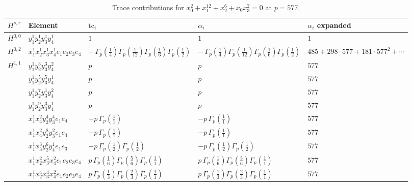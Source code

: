 \documentclass[11pt]{article}
\begin{document}
\begin{table}[ht]
\centering
\caption{Trace contributions for $x_0^{2} + x_1^{12} + x_2^{6} + x_0 x_3^{2} = 0$ at $p=577$.}\label{tab:deformed-25}
\renewcommand{\arraystretch}{1.1}
{\scriptsize
\begin{tabular}{@{}lllll@{}}
\toprule
$H^{s,r}$ & Element & $\mathrm{tc}_i$ & $\alpha_i$ & $\alpha_i$ expanded \\
\midrule
$H^{0,0}$ & $y_{1}^{1} y_{2}^{1} y_{3}^{1} y_{4}^{1}$ & $1$ & $1$ & $1$ \\
\midrule
$H^{0,2}$ & $x_{1}^{1} x_{2}^{1} x_{3}^{1} x_{4}^{1}  e_{1} e_{2} e_{3} e_{4}$ & $- \, \Gamma_p \left( \frac{1}{4} \right) \Gamma_p \left( \frac{1}{12} \right) \Gamma_p \left( \frac{1}{6} \right) \Gamma_p \left( \frac{1}{2} \right)$ & $- \, \Gamma_p \left( \frac{1}{4} \right) \Gamma_p \left( \frac{1}{12} \right) \Gamma_p \left( \frac{1}{6} \right) \Gamma_p \left( \frac{1}{2} \right)$ & $485{+}298{\cdot}577{+}181{\cdot}577^{2}{+}\cdots$ \\
\midrule
$H^{1,1}$ & $y_{1}^{1} y_{2}^{3} y_{3}^{3} y_{4}^{2}$ & $p \,$ & $p \,$ & $577$ \\
 & $y_{1}^{1} y_{2}^{5} y_{3}^{5} y_{4}^{1}$ & $p \,$ & $p \,$ & $577$ \\
 & $y_{1}^{1} y_{2}^{7} y_{3}^{1} y_{4}^{2}$ & $p \,$ & $p \,$ & $577$ \\
 & $y_{1}^{1} y_{2}^{9} y_{3}^{3} y_{4}^{1}$ & $p \,$ & $p \,$ & $577$ \\
 & $x_{1}^{1} x_{4}^{2} y_{2}^{4} y_{3}^{4} e_{1} e_{4}$ & $- p \, \Gamma_p \left( \frac{1}{1} \right)$ & $- p \, \Gamma_p \left( \frac{1}{1} \right)$ & $577$ \\
 & $x_{1}^{1} x_{4}^{2} y_{2}^{8} y_{3}^{2} e_{1} e_{4}$ & $- p \, \Gamma_p \left( \frac{1}{1} \right)$ & $- p \, \Gamma_p \left( \frac{1}{1} \right)$ & $577$ \\
 & $x_{1}^{1} x_{3}^{3} y_{2}^{6} y_{4}^{1} e_{1} e_{3}$ & $- p \, \Gamma_p \left( \frac{1}{2} \right) \Gamma_p \left( \frac{1}{2} \right)$ & $- p \, \Gamma_p \left( \frac{1}{2} \right) \Gamma_p \left( \frac{1}{2} \right)$ & $577$ \\
 & $x_{1}^{1} x_{2}^{2} x_{3}^{5} x_{4}^{2}  e_{1} e_{2} e_{3} e_{4}$ & $p \, \Gamma_p \left( \frac{1}{6} \right) \Gamma_p \left( \frac{5}{6} \right) \Gamma_p \left( \frac{1}{1} \right)$ & $p \, \Gamma_p \left( \frac{1}{6} \right) \Gamma_p \left( \frac{5}{6} \right) \Gamma_p \left( \frac{1}{1} \right)$ & $577$ \\
 & $x_{1}^{1} x_{2}^{4} x_{3}^{4} x_{4}^{2}  e_{1} e_{2} e_{3} e_{4}$ & $p \, \Gamma_p \left( \frac{1}{3} \right) \Gamma_p \left( \frac{2}{3} \right) \Gamma_p \left( \frac{1}{1} \right)$ & $p \, \Gamma_p \left( \frac{1}{3} \right) \Gamma_p \left( \frac{2}{3} \right) \Gamma_p \left( \frac{1}{1} \right)$ & $577$ \\

\end{tabular}}
\end{table}
\end{document}
